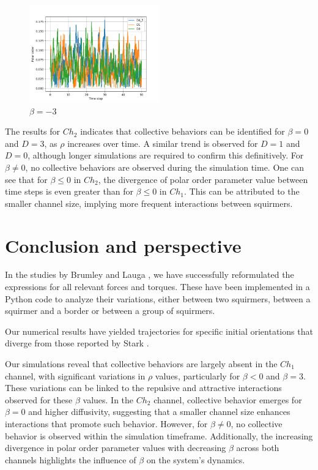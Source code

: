 \documentclass{article}
\begin{document}
\begin{figure}[H]
    \centering
    \includegraphics[width=0.5\textwidth]{videos/simulations/sim_D/betam3/dens_0_59/combined_polars.png}
    \caption{\footnotesize $\beta = -3$}
\end{figure}
The results for $Ch_2$ indicates that collective behaviors can be identified for $\beta = 0$ and $D = 3$, as
$\rho$ increases over time. 
A similar trend is observed for $D = 1$ and $D = 0$, although longer simulations are required to
confirm this definitively. For $\beta \neq 0$, no collective behaviors are observed during the simulation time. One can see that 
for $\beta \leq 0$ in $Ch_2$, the divergence of polar order parameter value between time steps is even greater
than for $\beta \leq 0$ in $Ch_1$. This can be attributed to the smaller channel size, implying more frequent interactions 
between squirmers.\\

\section{Conclusion and perspective}
In the studies by Brumley \cite{Brumley} and Lauga \cite{Lauga}, we have successfully reformulated the expressions for all relevant forces and torques. 
These have been implemented in a Python code to analyze their variations, either between two squirmers, between a 
squirmer and a border or between a group of squirmers.
 
Our numerical results have yielded trajectories for specific initial orientations that diverge from those reported 
by Stark \cite{Stark}.

Our simulations reveal that collective behaviors are largely absent in the $Ch_1$
channel, with significant variations in $\rho$ values, particularly for $\beta <0$ and $\beta = 3$. 
These variations can be linked to the repulsive 
and attractive interactions observed for these $\beta$ values. 
In the $Ch_2$ channel, collective behavior emerges for $\beta = 0$ and higher diffusivity, 
suggesting that a smaller channel size enhances 
interactions that promote such behavior. However, for $\beta \neq 0$, no collective behavior is observed within the simulation timeframe. 
Additionally, the increasing divergence in polar order parameter values with decreasing $\beta$ 
across both channels highlights the influence of $\beta$ on the system's dynamics.
\end{document}

